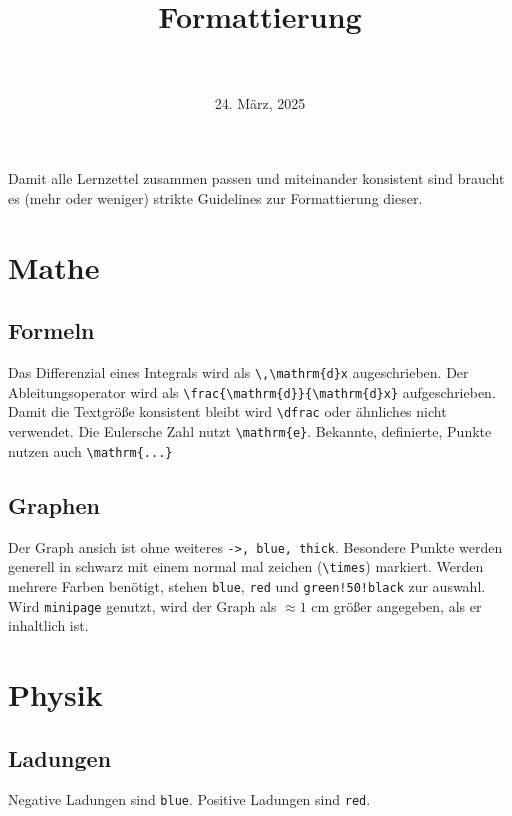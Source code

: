 \documentclass{article}
\title{
 \LARGE{\textls[200]{Guidelines}} \\
 \normalsize{\textls[250]{für die}} \\ [-0.7em]
 \LARGE{Formattierung} \\
 \normalsize{\textls[250]{der}} \\ [-0.7em]
 \LARGE{\textls[200]{Lernzettel}} 
}
\date{24. März, 2025}
\begin{document}
 
\maketitle
 
\noindent Damit alle Lernzettel zusammen passen und miteinander konsistent sind braucht es (mehr oder weniger) strikte Guidelines zur Formattierung dieser.
 
\section{Mathe} 
\subsection{Formeln}
Das Differenzial eines Integrals wird als \verb|\,\mathrm{d}x| augeschrieben. Der Ableitungsoperator wird als \verb|\frac{\mathrm{d}}{\mathrm{d}x}| aufgeschrieben. \newline
Damit die Textgröße konsistent bleibt wird \verb|\dfrac| oder ähnliches nicht verwendet. \newline
Die Eulersche Zahl nutzt \verb|\mathrm{e}|. Bekannte, definierte, Punkte nutzen auch \verb|\mathrm{...}|
 
\subsection{Graphen}
Der Graph ansich ist ohne weiteres \verb|->, blue, thick|. Besondere Punkte werden generell in schwarz mit einem normal mal zeichen (\verb|\times|) markiert. Werden mehrere Farben benötigt, stehen \verb|blue|, \verb|red| und \verb|green!50!black| zur auswahl. \newline
Wird \verb|minipage| genutzt, wird der Graph als $\approx 1$ cm größer angegeben, als er inhaltlich ist.  
 
\section{Physik}
\subsection{Ladungen}
Negative Ladungen sind \verb|blue|. Positive Ladungen sind \verb|red|. 
 
\end{document}
